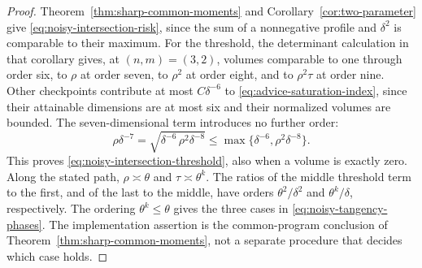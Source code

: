 \begin{proof}
Theorem~\ref{thm:sharp-common-moments} and
Corollary~\ref{cor:two-parameter} give
\eqref{eq:noisy-intersection-risk}, since the sum of a nonnegative
profile and $\delta^2$ is comparable to their maximum.
For the threshold, the determinant calculation in that corollary gives,
at $(n,m)=(3,2)$, volumes comparable to one through order six, to
$\rho$ at order seven, to $\rho^2$ at order eight, and to
$\rho^2\tau$ at order nine. Other checkpoints contribute at most
$C\delta^{-6}$ to \eqref{eq:advice-saturation-index}, since their
attainable dimensions are at most six and their normalized volumes are
bounded. The seven-dimensional term introduces no further order:
\[
 \rho\delta^{-7}
   =\sqrt{\delta^{-6}\,\rho^2\delta^{-8}}
   \le\max\{\delta^{-6},\rho^2\delta^{-8}\}.
\]
This proves \eqref{eq:noisy-intersection-threshold}, also when a volume
is exactly zero. Along the stated path, $\rho\asymp\theta$ and
$\tau\asymp\theta^k$. The ratios of the middle threshold term to
the first, and of the last to the middle, have orders
$\theta^2/\delta^2$ and $\theta^k/\delta$, respectively.
The ordering $\theta^k\le\theta$ gives the three cases in
\eqref{eq:noisy-tangency-phases}. The implementation assertion is the
common-program conclusion of Theorem~\ref{thm:sharp-common-moments},
not a separate procedure that decides which case holds.
\end{proof}
